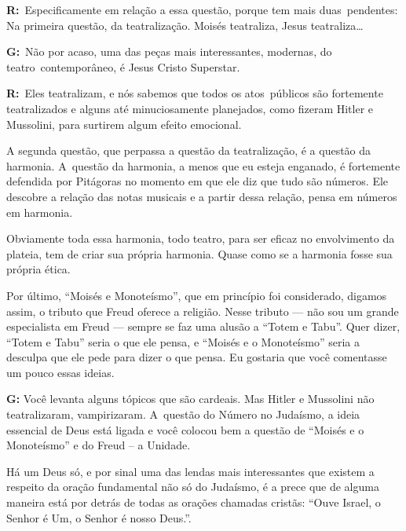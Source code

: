  

\textbf{R:}~Especificamente em relação a essa questão, porque tem mais
duas\textbf{}~pendentes: Na primeira questão, da teatralização. Moisés
teatraliza, Jesus teatraliza…

 

\textbf{G:}~Não por acaso, uma das peças mais interessantes, modernas,
do teatro\textbf{}~contemporâneo, é Jesus Cristo Superstar.

 

\textbf{R:}~Eles teatralizam, e nós sabemos que todos os
atos\textbf{}~públicos são fortemente teatralizados e alguns até
minuciosamente planejados, como fizeram Hitler e Mussolini, para
surtirem algum efeito emocional.

 

A segunda questão, que perpassa a questão da teatralização, é a questão
da harmonia. A~questão da harmonia, a menos que eu esteja enganado, é
fortemente defendida por Pitágoras no momento em que ele diz que tudo
são números. Ele descobre a relação das notas musicais e a partir dessa
relação, pensa em números em harmonia.

 

Obviamente toda essa harmonia, todo teatro, para ser eficaz no
envolvimento da plateia, tem de criar sua própria harmonia. Quase como
se a harmonia fosse sua própria ética.

 

Por último, ``Moisés e Monoteísmo'', que em princípio foi considerado,
digamos assim, o tributo que Freud oferece a religião. Nesse tributo ---
não sou um grande especialista em Freud --- sempre se faz uma alusão a
``Totem e Tabu''. Quer dizer, ``Totem e Tabu'' seria o que ele pensa, e
``Moisés e o Monoteísmo'' seria a desculpa que ele pede para dizer o que
pensa. Eu gostaria que você comentasse um pouco essas ideias.

 

\textbf{G:} Você levanta alguns tópicos que são cardeais. Mas Hitler e
Mussolini não teatralizaram, vampirizaram. A~questão do Número no
Judaísmo, a ideia essencial de Deus está ligada e você colocou bem a
questão de ``Moisés e o Monoteísmo'' e do Freud -- a Unidade.

 

Há um Deus só, e por sinal uma das lendas mais interessantes que existem
a respeito da oração fundamental não só do Judaísmo, é a prece que de
alguma maneira está por detrás de todas as orações chamadas cristãs:
``Ouve Israel, o Senhor é Um, o Senhor é nosso Deus.''.

